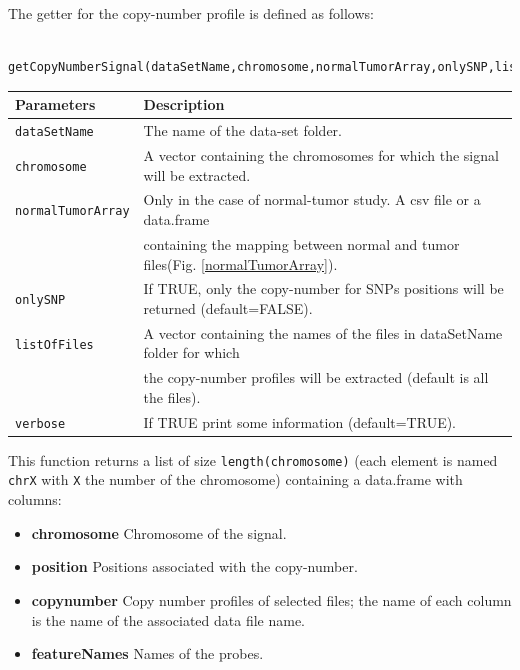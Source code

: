 \documentclass[a4paper,10pt]{article}
\begin{document}
		The getter for the copy-number profile is defined as follows:
		\begin{verbatim}	
		getCopyNumberSignal(dataSetName,chromosome,normalTumorArray,onlySNP,listOfFiles,verbose)
		\end{verbatim}
	
		\begin{center}
			\begin{tabular}{|l|l|}
				\hline
				Parameters & Description\\
				\hline
				\texttt{dataSetName} & The name of the data-set folder.\\
				\texttt{chromosome} & A vector containing the chromosomes for which the signal will be extracted.\\
				\texttt{normalTumorArray} & Only in the case of normal-tumor study. A csv file or a data.frame\\
				~~ & containing the mapping between normal and tumor files(Fig. \ref{normalTumorArray}).\\
				\texttt{onlySNP} & If TRUE, only the copy-number for SNPs positions will be returned (default=FALSE).\\
				\texttt{listOfFiles} & A vector containing the names of the files in dataSetName folder for which\\
				~ & the copy-number profiles will be extracted (default is all the files).\\
				\texttt{verbose} & If TRUE print some information (default=TRUE).\\
				\hline	
			\end{tabular}		
		\end{center}
		
		This function returns a list of size \texttt{length(chromosome)} (each element is named \texttt{chrX} with \texttt{X} the number of the chromosome) containing a data.frame with columns:
		\begin{itemize}
			\item \textbf{chromosome} Chromosome of the signal.
			\item \textbf{position} Positions associated with the copy-number.
			\item \textbf{copynumber} Copy number profiles of selected files; the name of each column is the name of the associated data file name. 			
			\item \textbf{featureNames} Names of the probes.
		\end{itemize}
		~~\\
		
\end{document}
